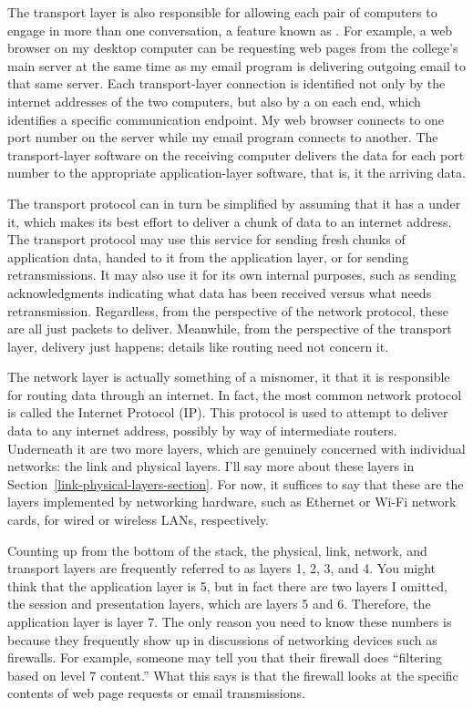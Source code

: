 The transport layer is also responsible for allowing each pair of
computers to engage in more than one conversation, a feature known as
.  For example, a web browser on my desktop
computer can be requesting web pages from the college's main server at
the same time as my email program is delivering outgoing email to that
same server.  Each transport-layer connection is identified not only
by the internet addresses of the two computers, but also by a
 on each end, which identifies a specific
communication endpoint.  My web browser connects to one port
number on the server while my email program connects to another.  The
transport-layer software on the receiving computer delivers the data for each port number to the
appropriate application-layer software, that is, it
 the arriving data.

The transport protocol can in turn be simplified by assuming that it
has a  under it, which makes its best
effort to deliver a chunk of data to an internet address.  The
transport protocol may use this service for sending fresh chunks of
application data, handed to it from the application layer, or for
sending retransmissions.  It may also use it for its own internal
purposes, such as sending acknowledgments indicating what data has
been received versus what needs retransmission.  Regardless, from the
perspective of the network protocol, these are all just
packets to deliver.  Meanwhile, from the perspective of the transport
layer, delivery just happens; details like routing need not concern
it.

The network layer is actually something of a misnomer, it that it is
responsible for routing data through an internet.
In fact, the most common network protocol is called the Internet Protocol (IP).
This protocol is used to attempt to deliver data to
any internet address, possibly by way of intermediate routers.
Underneath it are two
more layers, which are genuinely concerned with individual networks:
the link and physical layers.  I'll say more about these layers in
Section~\ref{link-physical-layers-section}.  For now, it suffices to say that these are the
layers implemented by networking hardware, such as Ethernet or
Wi-Fi network cards, for wired or wireless LANs, respectively.

Counting up from the bottom of the stack, the physical, link, network, and
transport layers are frequently referred to as layers 1, 2, 3, and 4.
You might think that the application layer is 5, but in fact there are
two layers I omitted, the session and presentation layers, which are
layers 5 and 6.  Therefore, the application
layer is layer 7.  The only reason you need to know these numbers is
because they frequently show up in discussions of networking devices such
as firewalls.  For example, someone may tell you that their firewall
does ``filtering based on level 7 content.''  What this says is that
the firewall looks at the specific contents of web page requests or email
transmissions.

